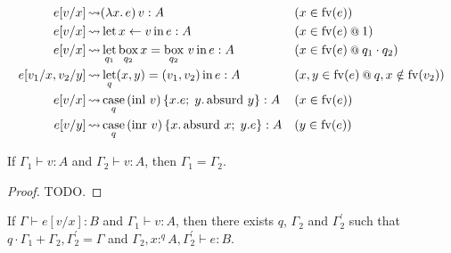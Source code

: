 \documentclass[acmsmall,screen,nonacm]{acmart}
\makeatletter
\DeclareMathOperator{\llet}{\text{let}}
\DeclareMathOperator{\lin}{\text{in}}
\DeclareMathOperator{\case}{\text{case}}
\DeclareMathOperator{\bbox}{\text{box}}
\newcommand{\at}{\mathbin{\mbox{\small\ensuremath{@}}}}
\DeclareMathOperator{\inl}{\text{inl}}
\DeclareMathOperator{\inr}{\text{inr}}
\DeclareMathOperator{\absurd}{\text{absurd}}
\newcommand{\tee}{\vdash}
\DeclareMathOperator{\red}{\rightsquigarrow}
\makeatother
\begin{document}
\begin{align*}
  e[v/x] &\red (\lambda x.\, e)\, v : A && (x \in \mathrm{fv}(e)) \\
  e[v/x] &\red \llet x \leftarrow v \lin e : A && (x \in \mathrm{fv}(e) \at 1) \\ 
  e[v/x] &\red \llet_{q_1} \bbox_{q_2} x = \bbox_{q_2}\, v \lin e : A && (x \in \mathrm{fv}(e) \at q_1 \cdot q_2)\\
  e[v_1/x, v_2/y] &\red \llet_q (x, y) = (v_1, v_2) \lin e : A
  && (x, y \in \mathrm{fv}(e) \at q, x \notin \mathrm{fv}(v_2)) \\
  e[v/x] &\red \case_q\, (\inl\, v)\, \{x.e;\; y.\absurd \, y\} : A && (x \in \mathrm{fv}(e)) \\
  e[v/y] &\red \case_q\, (\inr\, v)\, \{x.\absurd \, x;\; y.e\} : A && (y \in \mathrm{fv}(e))
\end{align*}

\begin{lemma}
\label{lem:graded-modal-equal-contexts}
  If $\Gamma_1 \tee v : A$ and $\Gamma_2 \tee v : A$, then $\Gamma_1 = \Gamma_2$.
\end{lemma}

\begin{proof}
  TODO.
  
\end{proof}

\begin{lemma}
\label{lem:graded-modal-backward-substitution}
  If $\Gamma \tee e[v/x] : B$ and $\Gamma_1 \tee v : A$, then there exists $q$, $\Gamma_2$ and $\Gamma_2^\prime$ such that $q \cdot \Gamma_1 + \Gamma_2, \Gamma_2^\prime = \Gamma$ and $\Gamma_2, x :^q A, \Gamma_2^\prime \tee e : B$.
\end{lemma}
\end{document}
